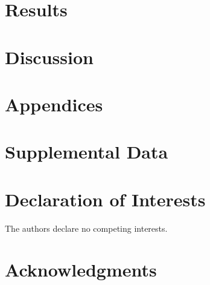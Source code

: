 \documentclass[12pt]{article}
\begin{document}
\section{Results}

\section{Discussion}


\section{Appendices}


\section{Supplemental Data}


\section{Declaration of Interests}

The authors declare no competing interests.

\section{Acknowledgments}
\end{document}
